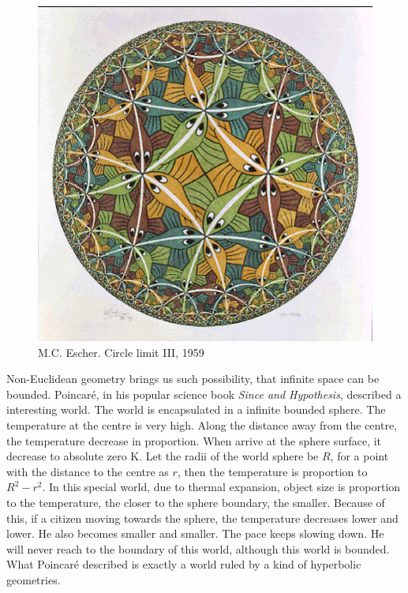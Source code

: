 \documentclass{article}
\begin{document}
\begin{figure}[htbp]
 \centering
 \includegraphics[scale=1.0]{img/circle-limit-III-1959.jpg}
 \captionsetup{labelformat=empty}
 \caption{M.C. Escher. Circle limit III, 1959}
 \label{fig:circle-limit-3}
\end{figure}

Non-Euclidean geometry brings us such possibility, that infinite space can be bounded. Poincaré, in his popular science book {\em Since and Hypothesis}, described a interesting world. The world is encapsulated in a infinite bounded sphere. The temperature at the centre is very high. Along the distance away from the centre, the temperature decrease in proportion. When arrive at the sphere surface, it decrease to absolute zero K. Let the radii of the world sphere be $R$, for a point with the distance to the centre as $r$, then the temperature is proportion to $R^2 - r^2$. In this special world, due to thermal expansion, object size is proportion to the temperature, the closer to the sphere boundary, the smaller. Because of this, if a citizen moving towards the sphere, the temperature decreases lower and lower. He also becomes smaller and smaller. The pace keeps slowing down. He will never reach to the boundary of this world, although this world is bounded. What Poincaré described is exactly a world ruled by a kind of hyperbolic geometries.
\end{document}
